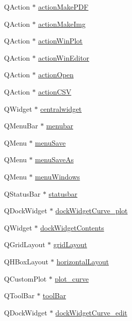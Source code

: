 \begin{DoxyCompactItemize}
\item 
Q\+Action $\ast$ \hyperlink{a00026_af013c084ff0ed9ae39a60aa7a39bdd91}{action\+Make\+P\+D\+F}
\item 
Q\+Action $\ast$ \hyperlink{a00026_a345313e538e5ef49cd27c1fc0bdd4173}{action\+Make\+Img}
\item 
Q\+Action $\ast$ \hyperlink{a00026_a0aeb289d8df9db6f4329e9000e44d511}{action\+Win\+Plot}
\item 
Q\+Action $\ast$ \hyperlink{a00026_aa5d56420958ab4fd1239e29714d75e18}{action\+Win\+Editor}
\item 
Q\+Action $\ast$ \hyperlink{a00026_a3ceb57268680eb23f6a3d522b303bb43}{action\+Open}
\item 
Q\+Action $\ast$ \hyperlink{a00026_afae3d61aac77b6c20a7953b3adba9672}{action\+C\+S\+V}
\item 
Q\+Widget $\ast$ \hyperlink{a00026_afff870ab422d2b873976067827089af1}{centralwidget}
\item 
Q\+Menu\+Bar $\ast$ \hyperlink{a00026_af09fe2fe1f34525f5caeb5ada7d297bf}{menubar}
\item 
Q\+Menu $\ast$ \hyperlink{a00026_a36a184d4c55f5de1b542257cbe23adaf}{menu\+Save}
\item 
Q\+Menu $\ast$ \hyperlink{a00026_a2568794cbc6cc9907104efbfd79eba7d}{menu\+Save\+As}
\item 
Q\+Menu $\ast$ \hyperlink{a00026_a0c7cba2d30d21689f48f1981e976c0b6}{menu\+Windows}
\item 
Q\+Status\+Bar $\ast$ \hyperlink{a00026_ab06a6e9bb964fc017cb9a246ee1f9ecb}{statusbar}
\item 
Q\+Dock\+Widget $\ast$ \hyperlink{a00026_a0edc87fb115fede171c0da1f99000874}{dock\+Widget\+Curve\+\_\+plot}
\item 
Q\+Widget $\ast$ \hyperlink{a00026_a78f9e81c1adc0092b7e4d6efb640dc43}{dock\+Widget\+Contents}
\item 
Q\+Grid\+Layout $\ast$ \hyperlink{a00026_ad06b82b83a9a74377d6ca44ae699f945}{grid\+Layout}
\item 
Q\+H\+Box\+Layout $\ast$ \hyperlink{a00026_ad3009fa6ef8958b3e052715beba75d28}{horizontal\+Layout}
\item 
Q\+Custom\+Plot $\ast$ \hyperlink{a00026_a1d46308dee8db7e3c99af65f13055479}{plot\+\_\+curve}
\item 
Q\+Tool\+Bar $\ast$ \hyperlink{a00026_a884ecf47fc47f20bd60e9406b1ef88f1}{tool\+Bar}
\item 
Q\+Dock\+Widget $\ast$ \hyperlink{a00026_a83360bdd61e994537715aa7c38e4e5b6}{dock\+Widget\+Curve\+\_\+edit}

\end{DoxyCompactItemize}
